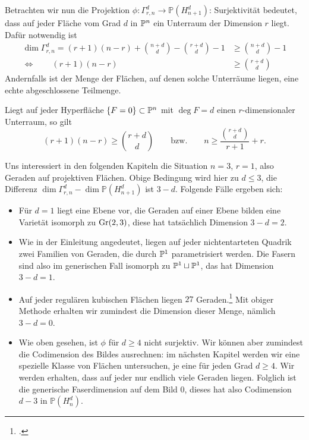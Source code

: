 Betrachten wir nun die Projektion $\phi \colon \Gamma_{r,n}^d \to \mathbb P(H_{n+1}^d)$: Surjektivität bedeutet, dass auf jeder Fläche vom Grad $d$ in $\mathbb P^{n}$ ein Unterraum der Dimension $r$ liegt. Dafür notwendig ist
\begin{align*}
\dim \Gamma_{r,n}^d = (r+1)(n-r) + \binom{n+d}d - \binom{r+d}d - 1 &\geq \binom{n+d}d - 1 \\
\Leftrightarrow \qquad (r+1)(n-r) &\geq \binom{r+d}d
\end{align*}
Andernfalls ist der Menge der Flächen, auf denen solche Unterräume liegen, eine echte abgeschlossene Teilmenge.
\begin{theorem}
Liegt auf jeder Hyperfläche $\{F = 0\} \subset \mathbb P^{n}$ mit $\deg F = d$ einen $r$-dimensionaler Unterraum, so gilt
\begin{equation}
(r+1)(n-r) \geq \binom{r+d}d \qquad\text{bzw.}\qquad n \geq \frac{\binom{r+d}d}{r+1} + r.
\end{equation}
\end{theorem}

Uns interessiert in den folgenden Kapiteln die Situation $n=3$, $r=1$, also Geraden auf projektiven Flächen. Obige Bedingung wird hier zu $d \leq 3$, die Differenz $\dim \Gamma_{r,n}^d - \dim \mathbb P(H_{n+1}^d)$ ist $3-d$. Folgende Fälle ergeben sich:
\begin{itemize}
\item Für $d=1$ liegt eine Ebene vor, die Geraden auf einer Ebene bilden eine Varietät isomorph zu $\grass 2/3$, diese hat tatsächlich Dimension $3-d = 2$.
\item Wie in der Einleitung angedeutet, liegen auf jeder nichtentarteten Quadrik zwei Familien von Geraden, die durch $\mathbb P^{1}$ parametrisiert werden. Die Fasern sind also im generischen Fall isomorph zu $\mathbb P^{1} \sqcup \mathbb P^{1}$, das hat Dimension $3-d = 1$.
\item Auf jeder regulären kubischen Flächen liegen $27$ Geraden.\footcite[siehe etwa][]{Henderson} Mit obiger Methode erhalten wir zumindest die Dimension dieser Menge, nämlich $3-d = 0$.
\item Wie oben gesehen, ist $\phi$ für $d \geq 4$ nicht surjektiv. Wir können aber zumindest die Codimension des Bildes ausrechnen: im nächsten Kapitel werden wir eine spezielle Klasse von Flächen untersuchen, je eine für jeden Grad $d \geq 4$. Wir werden erhalten, dass auf jeder nur endlich viele Geraden liegen. Folglich ist die generische Faserdimension auf dem Bild $0$, dieses hat also Codimension $d-3$ in $\mathbb P(H_n^d)$.
\end{itemize}

